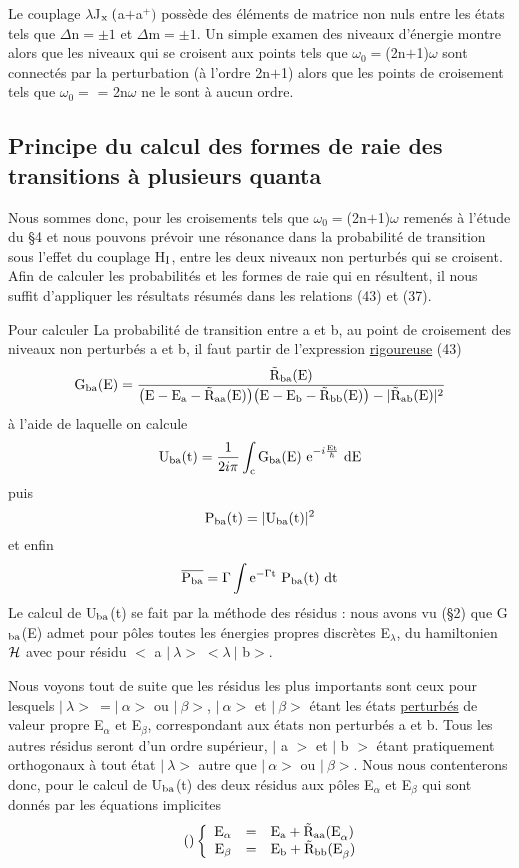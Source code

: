 Le couplage $\lambda$J$_{\text{x }}($a$+$a$^+)$ possède des éléments de matrice non nuls
entre les états tels que $\Delta$n$=\pm 1$ et $\Delta$m$=\pm 1$. Un simple examen des niveaux
d'énergie montre alors que les niveaux qui se croisent aux points tels que
$\omega_0=$(2n$+$1)$\omega$ sont connectés par la perturbation (à l'ordre 2n$+$1) alors que
les points de croisement tels que $\omega_0=$ = 2n$\omega$ ne le sont à aucun ordre.

\subsection{Principe du calcul des formes de raie des transitions à plusieurs quanta}%
Nous sommes donc, pour les croisements tels que $\omega_0=$(2n$+$1)$\omega$
remenés à l'étude du \S 4 et nous pouvons prévoir une résonance dans la probabilité
de transition sous l'effet du couplage H$_{\text{I}}$, entre les deux niveaux non
perturbés qui se croisent. Afin de calculer les probabilités et les formes de
raie qui en résultent, il nous suffit d'appliquer les résultats résumés dans
les relations (43) et (37).

Pour calculer La probabilité de transition entre a et b, au point de croisement
des niveaux non perturbés a et b, il faut partir de l'expression \ul{rigoureuse} (43)
\[
\text{G}_{\text{ba}}\text{(E)}=\frac{\tilde{\text{R}}_{\text{ba}}\text{(E)}}
{\big(\text{E}-\text{E}_{\text{a}}-\tilde{\text{R}}_{\text{aa}}\text{(E)}\big)
\big(\text{E}-\text{E}_{\text{b}}-\tilde{\text{R}}_{\text{bb}}\text{(E)}\big)-
|\tilde{\text{R}}_{\text{ab}}\text{(E)}|^2}
\]
à l'aide de laquelle on calcule
\[
\text{U}_{\text{ba}}\text{(t)}=\frac{1}{2i\pi}\int_{\text{c}}\text{G}_{\text{ba}}\text{(E) e}^{-i\frac{\text{Et}}{\hbar}}\text{ dE}
\]
puis
\[
\text{P}_{\text{ba}}\text{(t)}=|\text{U}_{\text{ba}}\text{(t)}|^2
\]
et enfin
\[
\overline{\text{P}_{\text{ba}}}=\Gamma\int\text{e}^{-\Gamma\text{t}}\text{ P}_{\text{ba}}\text{(t) dt}
\]
Le calcul de U$_{\text{ba}}$(t) se fait par la méthode des résidus : nous avons vu (\S 2) que
G$_{\text{ba}}$(E) admet pour pôles toutes les énergies propres discrètes E$_\lambda$, du hamiltonien
$\mathcal{H}$ avec pour résidu $<$ a $|\ \lambda>\;<\lambda\ |$ b$>$.


Nous voyons tout de suite que les résidus les plus importants sont ceux pour
lesquels $|\ \lambda>\ =|\ \alpha>$ ou $|\ \beta >$, $|\ \alpha>$ et $|\ \beta >$ étant les états \ul{perturbés} de
valeur propre E$_\alpha$ et E$_\beta$, correspondant aux états non perturbés a et b. Tous
les autres résidus seront d'un ordre supérieur, $|$ a $>$ et $|$ b $>$ étant pratiquement
orthogonaux à tout état $|\ \lambda>$ autre que $|\ \alpha>$ ou $|\ \beta >$. Nous nous contenterons donc,
pour le calcul de U$_{\text{ba}}$(t) des deux résidus aux pôles E$_\alpha$ et E$_\beta$
qui sont donnés par les équations implicites
\[
\tag{}\left\{ \begin{array}{rcl}
\text{E}_\alpha & = & \text{E}_{\text{a}}+\tilde{\text{R}}_{\text{aa}}\text{(E}_\alpha) \\
\text{E}_\beta & = & \text{E}_{\text{b}}+\tilde{\text{R}}_{\text{bb}}\text{(E}_\beta) \end{array} \right.
\]

